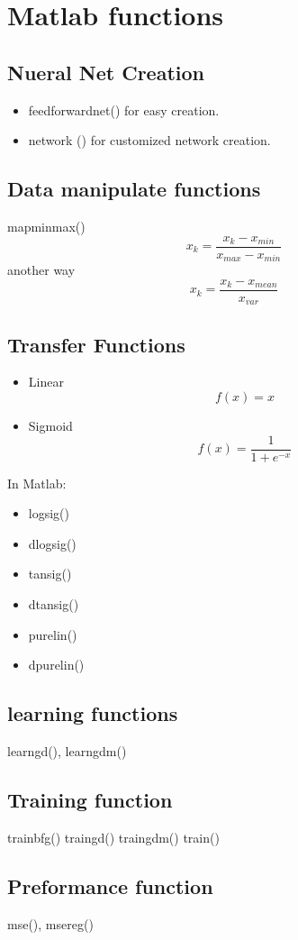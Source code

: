 \documentclass[a4paper,10pt]{article}
\begin{document}
\section{Matlab functions}
	\subsection{Nueral Net Creation}
		\begin{itemize}
			\item feedforwardnet() for easy creation.
			\item network () for customized network creation.
		\end{itemize}
	\subsection{Data manipulate functions}
		mapminmax() \[ x_k = \frac{ x_k - x_{min} }{ x_{max} - x_{min}} \]
		another way \[ x_k = \frac{ x_k - x_{mean} }{ x_{var} } \]
	\subsection{Transfer Functions}
		\begin{itemize}
			\item Linear     \[ f(x) = x \]
			\item Sigmoid    \[ f(x) = \frac{1}{1+e^{-x}} \]
		\end{itemize}
		In Matlab:
		\begin{itemize}
			\item logsig()
			\item dlogsig()
			\item tansig()
			\item dtansig()
			\item purelin()
			\item dpurelin()
		\end{itemize}
	\subsection{learning functions}
		learngd(), learngdm()
	\subsection{Training function}
		trainbfg()
		traingd()
		traingdm()
		train()
	\subsection{Preformance function}
		mse(), msereg()
\end{document}
